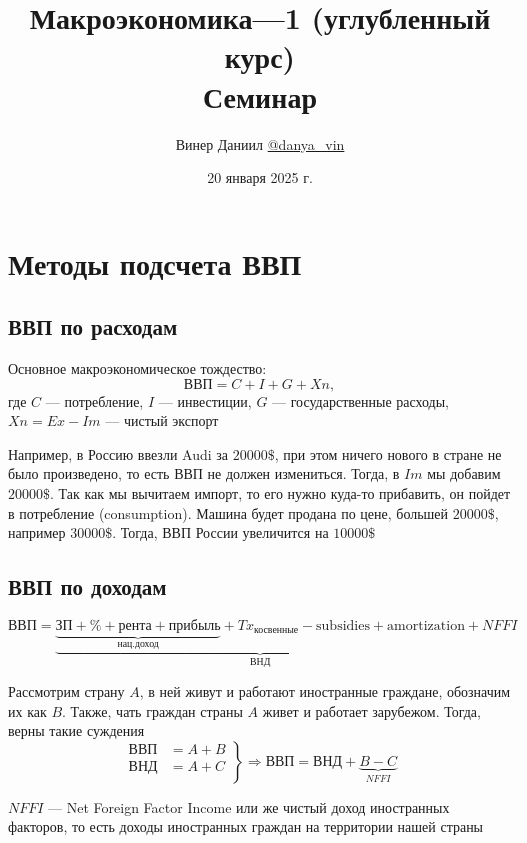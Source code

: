 \documentclass[a4paper, 10pt]{article}
\title{\LARGE{Макроэкономика—1 (углубленный курс)}\\[2mm]
\large{Семинар}}
\author{Винер Даниил  \href{https://t.me/danya_vin}{@danya\_vin}}
\date{20 января 2025 г.}
\begin{document}
\maketitle
\setlength{\parindent}{15pt}
\setlength{\parskip}{2mm}
\section{Методы подсчета ВВП}
\subsection{ВВП по расходам}
 Основное макроэкономическое тождество:
\begin{equation*}
    \text{ВВП}=C+I+G+Xn,
\end{equation*}
где $C$ — потребление, $I$ — инвестиции, $G$ — государственные расходы, $Xn=Ex-Im$ — чистый экспорт

Например, в Россию ввезли Audi за $20000\$$, при этом ничего нового в стране не было произведено, то есть ВВП не должен измениться. Тогда, в $Im$ мы добавим $20000\$$. Так как мы вычитаем импорт, то его нужно куда-то прибавить, он пойдет в потребление (consumption). Машина будет продана по цене, большей $20000\$$, например $30000\$$. Тогда, ВВП России увеличится на $10000\$$


\subsection{ВВП по доходам}
\begin{equation*}
    \text{ВВП}=\underbrace{\underbrace{\text{ЗП}+\%+\text{рента}+\text{прибыль}}_{\text{нац.доход}}+Tx_{\text{косвенные}}-\text{subsidies}+\text{amortization}}_{\text{ВНД}}+NFFI
\end{equation*}

Рассмотрим страну $A$, в ней живут и работают иностранные граждане, обозначим их как $B$. Также, чать граждан страны $A$ живет и работает зарубежом. Тогда, верны такие суждения
\begin{equation*}
    \left.\begin{aligned}
        \text{ВВП}&=A+B\\
        \text{ВНД}&=A+C\\
    \end{aligned}\right\}\Longrightarrow\text{ВВП}=\text{ВНД}+\underbrace{B-C}_{NFFI}
\end{equation*}

 $NFFI$ — Net Foreign Factor Income или же чистый доход иностранных факторов, то есть доходы иностранных граждан на территории нашей страны
\end{document}
